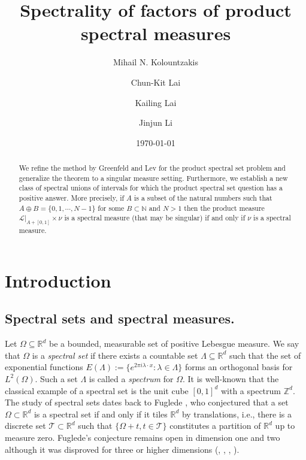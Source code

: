 \documentclass[reqno,a4paper,12pt]{amsart}
\title[Spectrality of factors of product spectral measures]{Spectrality of factors of  product spectral measures}
\author{Mihail N. Kolountzakis}
\author{Chun-Kit Lai}
\author{Kailing Lai}
\author[Jinjun Li]{Jinjun Li}
\numberwithin{equation}{section}
\newcommand{\N}{{\mathbb N}}
\newcounter{rem}
\theoremstyle{remark}
\numberwithin{equation}{section}
\def\N{\mathbb{N}}
\begin{document}
\begin{abstract}
We refine the method by Greenfeld and Lev for the product spectral set problem and generalize the theorem to a singular measure setting. Furthermore, we establish a new class of spectral unions of intervals for which the product spectral set question has a positive answer. More precisely,  if $A$ is a subset of the natural numbers such that $A\oplus B = \{0,1,\cdots, N-1\}$ for some $B\subset \N$ and $N>1$ then  the product measure $\mathcal{L}|_{A+[0,1]}\times \nu$ is a spectral measure (that may be singular) if and only if $\nu$ is a spectral measure. 
\end{abstract}

\date{\today}



\maketitle

\tableofcontents

\section{Introduction}

\subsection{Spectral sets and spectral measures.} Let $\Omega\subseteq\mathbb{R}^{d}$ be a bounded, measurable set of positive Lebesgue measure. We say that $\Omega$ is a \textit{spectral set} if there exists a countable set $\Lambda\subseteq\mathbb{R}^{d}$ such that the set of exponential functions
$E(\Lambda):=\{e^{2\pi i\lambda\cdot x}:\lambda\in \Lambda\}$
forms an orthogonal basis for $\textit{L}^{2}(\Omega)$. Such a set $\Lambda$ is called a \textit{spectrum }for $\Omega$. It is well-known that the classical example of a spectral set is the unit cube $[0,1]^{d}$ with a spectrum $\mathbb{Z}^{d}$. The study of spectral sets dates back to Fuglede \cite{F-JFA}, who conjectured that a set $\Omega\subset\mathbb{R}^{d}$ is a spectral set if and only if it tiles $\mathbb{R}^{d}$ by translations, i.e., there is  a discrete set $\mathcal{T}\subset\mathbb{R}^{d}$ such that $\{\Omega+t,t\in\mathcal{T}\}$ constitutes a partition of $\mathbb{R}^{d}$ up to measure zero. Fuglede's conjecture remains open in dimension one and two although it was disproved for three or higher dimensions (\cite{KM-CM}, \cite{KM-FM}, \cite{M-PAMS}, \cite{T-MRL}).
\end{document}

